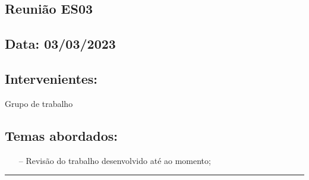 \subsection{Reunião ES03}\label{reuniaoES03}

\subsection*{Data: 03/03/2023}


\subsection*{Intervenientes:}
Grupo de trabalho

\subsection*{Temas abordados:}
\begin{itemize}
\item[--] Revisão do trabalho desenvolvido até ao momento;
\end{itemize}

\noindent \rule{\linewidth}{0.4pt}
\newline
